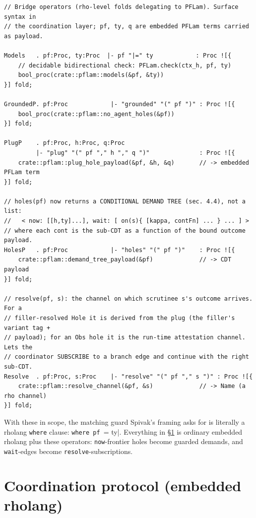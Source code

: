 \documentclass[11pt]{article}
\newcommand{\code}[1]{\lstinline[language=rho,basicstyle=\ttfamily\small]|#1|}
\begin{document}
\begin{lstlisting}[language=mettail]
// Bridge operators (rho-level folds delegating to PFLam). Surface syntax in
// the coordination layer; pf, ty, q are embedded PFLam terms carried as payload.

Models   . pf:Proc, ty:Proc  |- pf "|=" ty            : Proc ![{
    // decidable bidirectional check: PFLam.check(ctx_h, pf, ty)
    bool_proc(crate::pflam::models(&pf, &ty))
}] fold;

GroundedP. pf:Proc            |- "grounded" "(" pf ")" : Proc ![{
    bool_proc(crate::pflam::no_agent_holes(&pf))
}] fold;

PlugP    . pf:Proc, h:Proc, q:Proc
         |- "plug" "(" pf "," h "," q ")"              : Proc ![{
    crate::pflam::plug_hole_payload(&pf, &h, &q)       // -> embedded PFLam term
}] fold;

// holes(pf) now returns a CONDITIONAL DEMAND TREE (sec. 4.4), not a list:
//   < now: [[h,ty]...], wait: [ on(s){ [kappa, contFn] ... } ... ] >
// where each cont is the sub-CDT as a function of the bound outcome payload.
HolesP   . pf:Proc            |- "holes" "(" pf ")"    : Proc ![{
    crate::pflam::demand_tree_payload(&pf)             // -> CDT payload
}] fold;

// resolve(pf, s): the channel on which scrutinee s's outcome arrives. For a
// filler-resolved Hole it is derived from the plug (the filler's variant tag +
// payload); for an Obs hole it is the run-time attestation channel. Lets the
// coordinator SUBSCRIBE to a branch edge and continue with the right sub-CDT.
Resolve  . pf:Proc, s:Proc    |- "resolve" "(" pf "," s ")" : Proc ![{
    crate::pflam::resolve_channel(&pf, &s)             // -> Name (a rho channel)
}] fold;
\end{lstlisting}

\noindent
With these in scope, the matching guard Spivak's framing asks for is literally a rholang
\code{where} clause: \code{where pf |= ty}. Everything in \S\ref{sec:coord} is ordinary embedded
rholang plus these operators: \code{now}-frontier holes become guarded demands, and \code{wait}-edges
become \code{resolve}-subscriptions.

\section{Coordination protocol (embedded rholang)}\label{sec:coord}
\end{document}
